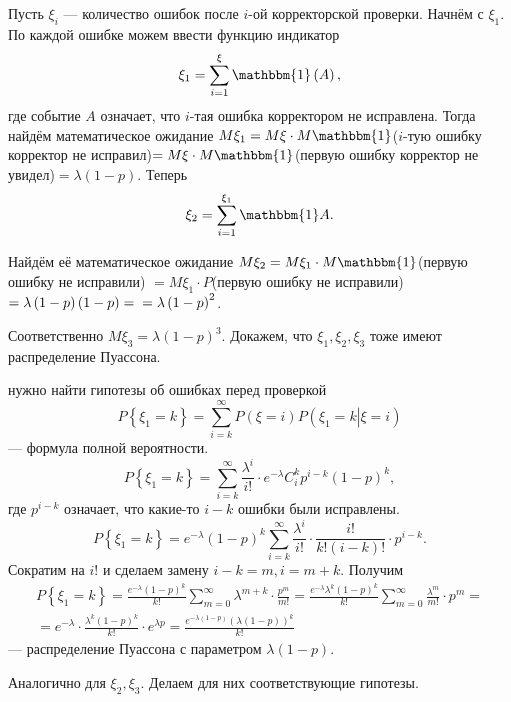 Пусть $ \xi_i$ --- количество ошибок после $i$-ой корректорской проверки.
Начнём с $ \xi_1$.
По каждой ошибке можем ввести функцию индикатор
$$ \xi_1 = \sum \limits_{i=1}^{ \xi } \mathbbm{1} \left( A \right),$$
где событие $A$ означает, что $i$-тая ошибка корректором не исправлена.
Тогда найдём математическое ожидание
$M \xi_1 = M \xi \cdot M \mathbbm{1}$($i$-тую ошибку корректор не исправил)$= M \xi \cdot M \mathbbm{1}$(первую ошибку корректор не увидел)$= \lambda \left( 1 - p \right) $.
Теперь
$$ \xi_2 =
\sum \limits_{i=1}^{ \xi_1} \mathbbm{1} A.$$

Найдём её математическое ожидание
$M \xi_2 = M \xi_1 \cdot M \mathbbm{1}$(первую ошибку не исправили)
$= M \xi_1 \cdot P$(первую ошибку не исправили)$= \lambda \left( 1-p \right) \left( 1-p \right) = \\
= \lambda \left( 1-p \right)^2$.

Соответственно $M \xi_3 = \lambda \left( 1-p \right)^3.$
Докажем, что $ \xi_1, \xi_2, \xi_3$ тоже имеют распределение Пуассона.

нужно найти гипотезы об ошибках перед проверкой
$$P \left\{ \xi_1 = k \right\} =
\sum \limits_{i=k}^{ \infty } P \left( \xi = i \right) P \left( \left. \xi_1 = k \right| \xi = i \right) $$
--- формула полной вероятности.
$$P \left\{ \xi_1 = k \right\} =
\sum \limits_{i=k}^{ \infty } \frac{ \lambda^i}{i!} \cdot e^{- \lambda } C_i^k p^{i-k} \left( 1-p \right)^k,$$
где $p^{i-k}$ означает, что какие-то $i-k$ ошибки были исправлены.
$$P \left\{ \xi_1 = k \right\} =
e^{- \lambda } \left( 1-p \right)^k \sum \limits_{i=k}^{ \infty } \frac{ \lambda^i}{i!} \cdot \frac{i!}{k! \left( i-k \right)!} \cdot p^{i-k}.$$
Сократим на $i!$ и сделаем замену $i - k = m, i = m + k$.
Получим
\begin{equation*}
\begin{split}
P \left\{ \xi_1 = k \right\} =
\frac{e^{- \lambda } \left( 1-p \right)^k}{k!} \sum \limits_{m=0}^{ \infty } \lambda^{m+k} \cdot \frac{p^m}{m!} =
\frac{e^{- \lambda } \lambda^k \left( 1-p \right)^k}{k!} \sum \limits_{m=0}^{ \infty } \frac{ \lambda^m}{m!} \cdot p^m = \\
= e^{- \lambda } \cdot \frac{ \lambda^k \left( 1-p \right)^k}{k!} \cdot e^{ \lambda p} =
\frac{e^{- \lambda \left( 1-p \right) } \left( \lambda \left( 1-p \right) \right)^k}{k!}
\end{split}
\end{equation*}
--- распределение Пуассона с параметром $ \lambda \left( 1-p \right) $.

Аналогично для $ \xi_2, \xi_3$.
Делаем для них соответствующие гипотезы.


